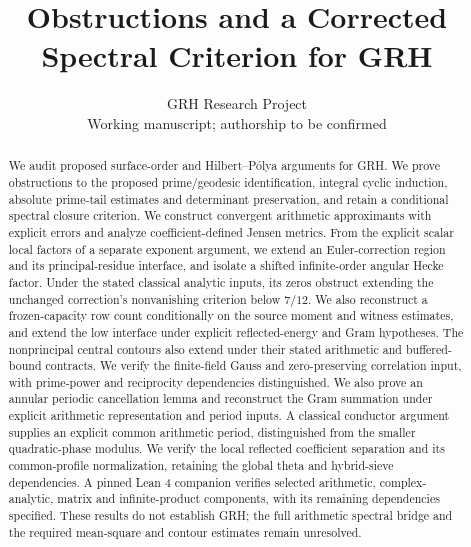
\title{Obstructions and a Corrected Spectral Criterion for GRH}
\author{GRH Research Project\\\small Working manuscript; authorship to be confirmed}
\maketitle\begin{center}\status\end{center}
\begin{abstract}
We audit proposed surface-order and Hilbert--P\'olya arguments for GRH.
We prove obstructions to the proposed prime/geodesic identification,
integral cyclic induction, absolute prime-tail estimates and determinant
preservation, and retain a conditional spectral closure criterion.
We construct convergent arithmetic approximants with explicit errors and
analyze coefficient-defined Jensen metrics. From the explicit scalar
local factors of a separate exponent argument, we extend an Euler-correction
region and its principal-residue interface, and isolate a shifted infinite-order angular Hecke factor.
Under the stated classical analytic inputs, its zeros obstruct extending
the unchanged correction's nonvanishing criterion below $7/12$.
We also reconstruct a frozen-capacity row count conditionally on the
source moment and witness estimates, and extend the low interface under
explicit reflected-energy and Gram hypotheses. The nonprincipal central
contours also extend under their stated arithmetic and buffered-bound
contracts. We verify the finite-field Gauss and zero-preserving correlation
input, with prime-power and reciprocity dependencies distinguished.
We also prove an annular periodic cancellation lemma and reconstruct the
Gram summation under explicit arithmetic representation and period inputs.
A classical conductor argument supplies an explicit common arithmetic period,
distinguished from the smaller quadratic-phase modulus.
We verify the local reflected coefficient separation and its common-profile
normalization, retaining the global theta and hybrid-sieve dependencies.
A pinned Lean 4 companion verifies
selected arithmetic, complex-analytic,
matrix and infinite-product components, with its remaining dependencies
specified. These results do not establish GRH; the full arithmetic
spectral bridge and the required mean-square and contour estimates
remain unresolved.
\end{abstract}


